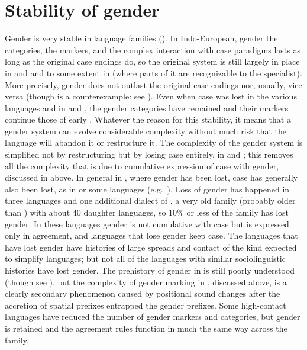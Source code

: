 \documentclass[output=collectionpaper]{langsci/langscibook}
\begin{document}
\section{Stability of gender}
\label{sec:Nich:6}
Gender is very stable in language families (\citealt{Matasovic2007,Matasovic2014}). In Indo-\linebreak[4]{}European, gender \textendash{} the categories, the markers, and the complex interaction with case para\-digms \textendash{} lasts as long as the original case endings do, so the original system is still largely in place in  and  and to some extent in  (where parts of it are recognizable to the specialist). More precisely, gender does not outlast the original case endings \textendash{} nor, usually, vice versa (though  is a counterexample: see \citealt{Kulikov2006}). Even when case was lost in the various  languages and in  and , the gender categories have remained and their markers continue those of early . Whatever the reason for this stability, it means that a gender system can evolve considerable complexity without much risk that the language will abandon it or restructure it. The complexity of the  gender system is simplified not by restructuring but by losing case entirely, in  and ; this removes all the complexity that is due to cumulative expression of case with gender, discussed in  above. In general in , where gender has been lost, case has generally also been lost, as in  or some  languages (e.g.\ ). Loss of gender has happened in three languages and one additional dialect of , a very old family (probably older than ) with about 40 daughter languages, so 10\% or less of the family has lost gender. In these languages gender is not cumulative with case but is expressed only in agreement, and languages that lose gender keep case. The languages that have lost gender have histories of large spreads and contact of the kind expected to simplify languages; but not all of the languages with similar sociolinguistic histories have lost gender. The prehistory of gender in  is still poorly understood (though see \citealt{Schulze1998}), but the complexity of gender marking in , discussed above, is a clearly secondary phenomenon caused by positional sound changes after the accretion of spatial prefixes entrapped the gender prefixes. Some high-contact languages have reduced the number of gender markers and categories, but gender is retained and the agreement rules function in much the same way across the family.
\end{document}
